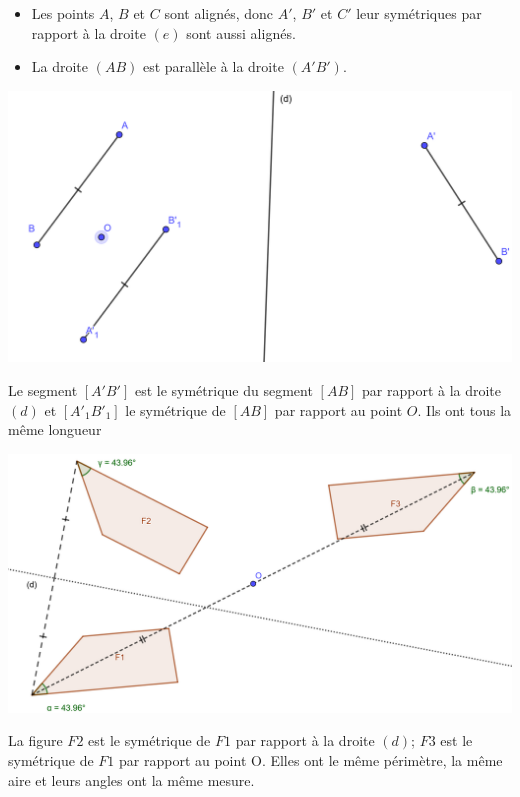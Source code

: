 \documentclass[12pt,a4paper]{article}
\begin{document}
\begin{myexs}
\begin{multicols}{2}
		\begin{itemize}
			\item Les points $A$, $B$ et $C$ sont alignés, donc $A'$, $B'$ et $C'$ leur symétriques par rapport à la droite $(e)$ sont aussi alignés.
			\item La droite $(AB)$ est parallèle à la droite $(A'B')$.
		\end{itemize}
	\end{multicols}
\end{myexs}

\begin{myex}
	\begin{center}
		\includegraphics[scale=0.2]{sym_seg}
	\end{center}
	
	Le segment $[A'B']$ est le symétrique du segment $[AB]$ par rapport à la droite $(d)$ et $[A'_1B'_1]$ le symétrique de $[AB]$ par rapport au point $O$. 
	Ils ont tous la même longueur
	
	
\end{myex}	

\begin{myex}
	\begin{center}
		\includegraphics[scale=0.2]{sym_figures}
	\end{center}
	
	La figure $F2$ est le symétrique de $F1$ par rapport à la droite $(d)$; $F3$ est le symétrique de $F1$ par rapport au point O.
	Elles ont le même périmètre, la même aire et leurs angles ont la même mesure.
\end{myex}
\end{document}

